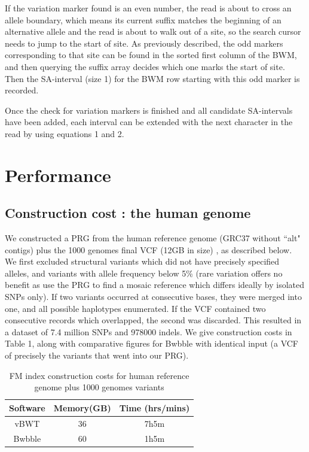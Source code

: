 \documentclass[runningheads,a4paper]{llncs}
\begin{document}
If the variation marker found is an even number, the read is about to cross an allele boundary, which means its current suffix matches the beginning of an alternative allele and the read is about to walk out of a site, so the search cursor needs to jump to the start of site. As previously described, the odd markers corresponding to that site can be found in the sorted first column of the BWM, and then querying the suffix array decides which one marks the start of site. Then the SA-interval (size 1) for the BWM row starting with this odd marker is recorded.

Once the check for variation markers is finished and all candidate SA-intervals have been added, each interval can be extended with the next character in the read by using equations 1 and 2.




\section{Performance}
\subsection{Construction cost : the human genome}
We   constructed a PRG from the human reference genome (GRC37 without ``alt" contigs) plus the 1000 genomes final VCF (12GB in size) \cite{1000g}, as described below. We first  excluded structural variants which did not have precisely specified alleles, and variants with allele frequency below 5\% (rare variation offers no benefit as use the PRG to find a mosaic reference which differs ideally by isolated SNPs only). If two variants occurred at consecutive bases, they were merged into one, and all possible haplotypes enumerated. If the VCF contained two consecutive records which overlapped, the second was discarded. This resulted in a dataset of 7.4 million SNPs and 978000 indels. We give construction costs in Table 1, along with comparative figures for Bwbble with identical input (a VCF of precisely the variants that went into our PRG). 
 
\begin{table}
\caption{FM index construction costs for human reference genome plus 1000 genomes variants}
\centering
\begin{tabular}{c c c}
\hline
Software  & Memory(GB) & Time (hrs/mins)\\
\hline
vBWT  & 36  & 7h5m \\
Bwbble  & 60 &  1h5m \\ 
\hline
\end{tabular}
\end{table}
\end{document}
